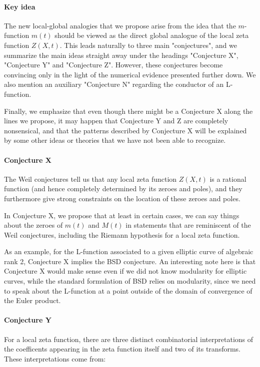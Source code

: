 \documentclass[paper=a4, fontsize=11pt]{scrartcl} %
\numberwithin{equation}{section} %
\numberwithin{figure}{section} %
\numberwithin{table}{section} %
\begin{document}
\paragraph{Key idea}
The new local-global analogies that we propose arise from the idea that the $m$-function $m(t)$ should be viewed as the direct global analogue of the local zeta function $Z(X, t)$. This leads naturally to three main "conjectures", and we summarize the main ideas straight away under the headings "Conjecture X", "Conjecture Y" and "Conjecture Z". However, these conjectures become convincing only in the light of the numerical evidence presented further down. We also mention an auxiliary "Conjecture N" regarding the conductor of an L-function.

Finally, we emphasize that even though there might be a Conjecture X along the lines we propose, it may happen that Conjecture Y and Z are completely nonsensical, and that the patterns described by Conjecture X will be explained by some other ideas or theories that we have not been able to recognize.

\paragraph{Conjecture X}

The Weil conjectures tell us that any local zeta function $Z(X, t)$ is a rational function (and hence completely determined by its zeroes and poles), and they furthermore give strong constraints on the location of these zeroes and poles.

In Conjecture X, we propose that at least in certain cases, we can say things about the zeroes of $m(t)$ and $M(t)$ in statements that are reminiscent of the Weil conjectures, including the Riemann hypothesis for a local zeta function.

As an example, for the L-function associated to a given elliptic curve of algebraic rank 2, Conjecture X implies the BSD conjecture. An interesting note here is that Conjecture X would make sense even if we did not know modularity for elliptic curves, while the standard formulation of BSD relies on modularity, since we need to speak about the L-function at a point outside of the domain of convergence of the Euler product.

\paragraph{Conjecture Y}

For a local zeta function, there are three distinct combinatorial interpretations of the coefficents appearing in the zeta function itself and two of its transforms. These interpretations come from:
\end{document}
